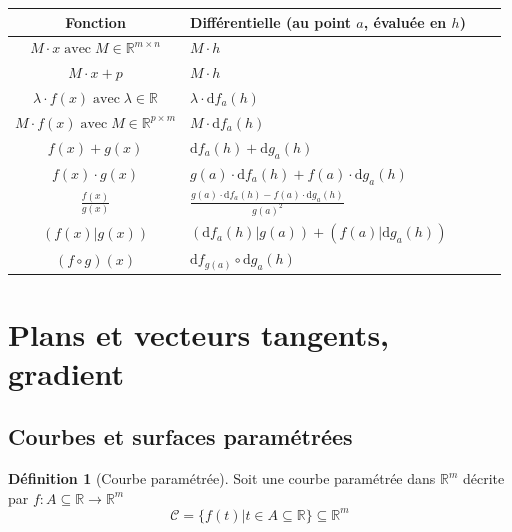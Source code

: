 \documentclass[11pt,a4paper]{article}
\theoremstyle{definition}
\newtheorem{mydef}{Définition}[section]
\newcommand{\R}{\mathbb{R}}
\newcommand{\dif}{\mathrm{d}}
\newcommand{\fl}{\rightarrow}
\begin{document}
\noindent
\begin{tabularx}{1.0\textwidth}{|S X|S X|}
\hline
Fonction & Différentielle (au point $a$, évaluée en $h$)\\
\hline
$ \displaystyle M \cdot x \;\text{avec}\; M \in \R^{m \times n} $ & $\displaystyle M \cdot h $\\
\hline
$ \displaystyle M \cdot x + p $ & $\displaystyle  M \cdot h $ \\
\hline
$ \lambda \cdot f(x) \;\text{avec}\; \lambda \in \R $ & $\displaystyle \lambda \cdot \dif f_a (h) $ \\
\hline
$ \displaystyle M \cdot f(x) \;\text{avec}\; M \in \R^{p \times m}$ & $\displaystyle M \cdot \dif f_a (h)$ \\
\hline
$ \displaystyle f(x) + g(x) $ & $ \displaystyle \dif f_a (h) + \dif g_a (h) $ \\
\hline
$ \displaystyle f(x)\cdot g(x) $ & $\displaystyle  g(a) \cdot \dif f_a(h) + f(a) \cdot \dif g_a(h) $ \\
\hline
$ \displaystyle \frac{f(x)}{g(x)} $ & $\displaystyle  \frac{g(a) \cdot \dif f_a(h) - f(a) \cdot \dif g_a(h) }{g(a)^2} $ \\
\hline
$ \displaystyle (f(x)|g(x)) $ & $\displaystyle  (\dif f_a(h) | g(a) ) + (f(a)|\dif g_a(h)) $ \\
\hline
$ \displaystyle (f \circ g)(x) $ & $\displaystyle  \dif f_{g(a)} \circ \dif g_a(h) $ \\
\hline
\end{tabularx}


\section{Plans et vecteurs tangents, gradient}

\subsection{Courbes et surfaces paramétrées}

\begin{mydef}[Courbe paramétrée]
Soit une courbe paramétrée dans $\R^m$ décrite par $f : A \subseteq \R \fl \R^m$
\[ \mathcal{C} = \{ f(t) | t \in A \subseteq \R \} \subseteq \R^m \]
\end{mydef}
\end{document}
